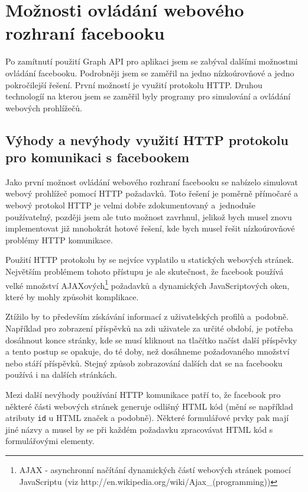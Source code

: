 \documentclass[thesis=M,czech]{FITthesis}[2013/05/10]
\begin{document}
\section{Možnosti ovládání webového rozhraní facebooku}

Po zamítnutí použití Graph API pro aplikaci jsem se zabýval dalšími možnostmi ovládání facebooku. Podrobněji jsem se zaměřil na jedno nízkoúrovňové a jedno pokročilejší řešení. První možností je využití protokolu HTTP. Druhou technologíí na kterou jsem se zaměřil byly programy pro simulování a ovládání webových prohlížečů.

\subsection{Výhody a nevýhody využití HTTP protokolu pro komunikaci s facebookem}

Jako první možnost ovládání webového rozhraní facebooku se nabízelo simulovat webový prohlížeč pomocí HTTP požadavků. Toto řešení je poměrně přímočaré a webový protokol HTTP je velmi dobře zdokumentovaný a~jednoduše používatelný, později jsem ale tuto možnost zavrhnul, jelikož bych musel znovu implementovat již mnohokrát hotové řešení, kde bych musel řešit nízkoúrovňové problémy HTTP komunikace. 

Použití HTTP protokolu by se nejvíce vyplatilo u statických webových stránek. Největším problémem tohoto přístupu je ale skutečnost, že facebook používá velké množství AJAXových\footnote{AJAX - asynchronní načítání dynamických částí webových stránek pomocí JavaScriptu (viz http://en.wikipedia.org/wiki/Ajax\_(programming))} požadavků a dynamických JavaScriptových oken, které by mohly způsobit komplikace. 

Ztížilo by to především získávání informací z uživatelských profilů a~podobně. Například pro zobrazení příspěvků na zdi uživatele za určité období, je potřeba dosáhnout konce stránky, kde se musí kliknout na tlačítko načíst další příspěvky a tento postup se opakuje, do té doby, než dosáhneme požadovaného množství nebo stáří příspěvků. Stejný způsob zobrazování dalších dat se na facebooku používá i na dalších stránkách.

Mezi další nevýhody používání HTTP komunikace patří to, že facebook pro některé části webových stránek generuje odlišný HTML kód (mění se například atributy \verb|id| u HTML značek a podobně). Některé formulářové prvky pak mají jiné názvy a musel by se při každém požadavku zpracovávat HTML kód s formulářovými elementy. 
\end{document}
